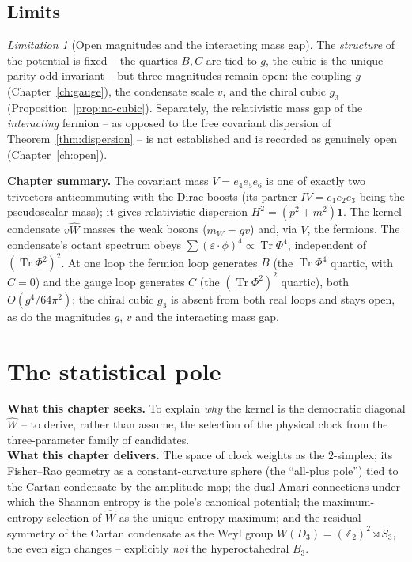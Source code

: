 \documentclass[11pt,oneside]{book}
\newcommand{\Wh}{\hat{W}}                         %
\newcommand{\Zt}{\mathbb{Z}_2}
\newcommand{\Tr}{\operatorname{Tr}}
\theoremstyle{plain}
\theoremstyle{definition}
\theoremstyle{remark}
\newtheorem{limitation}[theorem]{Limitation}
\begin{document}
\section{Limits}
\label{sec:mass-limits}

\begin{limitation}[Open magnitudes and the interacting mass gap]
\label{lim:mass}
The \emph{structure} of the potential is fixed -- the quartics $B,C$ are tied to
$g$, the cubic is the unique parity-odd invariant -- but three magnitudes remain
open: the coupling $g$ (Chapter~\ref{ch:gauge}), the condensate scale $v$, and the
chiral cubic $g_3$ (Proposition~\ref{prop:no-cubic}). Separately, the relativistic
mass gap of the \emph{interacting} fermion -- as opposed to the free covariant
dispersion of Theorem~\ref{thm:dispersion} -- is not established and is recorded as
genuinely open (Chapter~\ref{ch:open}).
\end{limitation}

\begin{leavesbox}
\textbf{Chapter summary.} The covariant mass $V=e_4e_5e_6$ is one of exactly two
trivectors anticommuting with the Dirac boosts (its partner $IV=e_1e_2e_3$ being the
pseudoscalar mass); it gives relativistic dispersion $H^2=(p^2+m^2)\mathbf 1$. The
kernel condensate $v\Wh$ masses the weak bosons ($m_W=gv$) and, via $V$, the
fermions. The condensate's octant spectrum obeys $\sum(\varepsilon\!\cdot\!\phi)^4
\propto\Tr\Phi^4$, independent of $(\Tr\Phi^2)^2$. At one loop the fermion loop
generates $B$ (the $\Tr\Phi^4$ quartic, with $C=0$) and the gauge loop generates
$C$ (the $(\Tr\Phi^2)^2$ quartic), both $O(g^4/64\pi^2)$; the chiral cubic $g_3$ is
absent from both real loops and stays open, as do the magnitudes $g$, $v$ and the
interacting mass gap.
\end{leavesbox}

\chapter{The statistical pole}
\label{ch:stat}

\begin{leavesbox}
\textbf{What this chapter seeks.} To explain \emph{why} the kernel is the
democratic diagonal $\Wh$ -- to derive, rather than assume, the selection of the
physical clock from the three-parameter family of candidates.\\[2pt]
\textbf{What this chapter delivers.} The space of clock weights as the
$2$-simplex; its Fisher--Rao geometry as a constant-curvature sphere (the
``all-plus pole'') tied to the Cartan condensate by the amplitude map; the dual
Amari connections under which the Shannon entropy is the pole's canonical potential;
the maximum-entropy selection of $\Wh$ as the unique entropy maximum; and the
residual symmetry of the Cartan condensate as the Weyl group
$W(D_3)=(\Zt)^2\rtimes S_3$, the even sign changes -- explicitly \emph{not} the
hyperoctahedral $B_3$.
\end{leavesbox}
\end{document}
